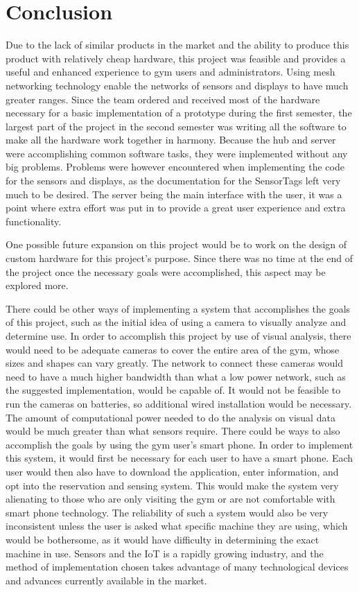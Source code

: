 \documentclass[PPFS.tex]{template/subfiles}
\begin{document}
\section{Conclusion}
Due to the lack of similar products in the market and the ability to produce this product with relatively cheap hardware, this project was feasible and provides a useful and enhanced experience to gym users and administrators. Using mesh networking technology enable the networks of sensors and displays to have much greater ranges. 
Since the team ordered and received most of the hardware necessary for a basic implementation of a prototype during the first semester, the largest part of the project in the second semester was writing all the software to make all the hardware work together in harmony. Because the hub and server were accomplishing common software tasks, they were implemented without any big problems. Problems were however encountered when implementing the code for the sensors and displays, as the documentation for the SensorTags left very much to be desired. The server being the main interface with the user, it was a point where extra effort was put in to provide a great user experience and extra functionality. 

One possible future expansion on this project would be to work on the design of custom hardware for this project's purpose. Since there was no time at the end of the project once the necessary goals were accomplished, this aspect may be explored more.

There could be other ways of implementing a system that accomplishes the goals of this project, such as the initial idea of using a camera to visually analyze and determine use. In order to accomplish this project by use of visual analysis, there would need to be adequate cameras to cover the entire area of the gym, whose sizes and shapes can vary greatly. The network to connect these cameras would need to have a much higher bandwidth than what a low power network, such as the suggested implementation, would be capable of. It would not be feasible to run the cameras on batteries, so additional wired installation would be necessary. The amount of computational power needed to do the analysis on visual data would be much greater than what sensors require. There could be ways to also accomplish the goals by using the gym user's smart phone. In order to implement this system, it would first be necessary for each user to have a smart phone. Each user would then also have to download the application, enter information, and opt into the reservation and sensing system. This would make the system very alienating to those who are only visiting the gym or are not comfortable with smart phone technology. The reliability of such a system would also be very inconsistent unless the user is asked what specific machine they are using, which would be bothersome, as it would have difficulty in determining the exact machine in use. Sensors and the IoT is a rapidly growing industry, and the method of implementation chosen takes advantage of many technological devices and advances currently available in the market.
\end{document}
